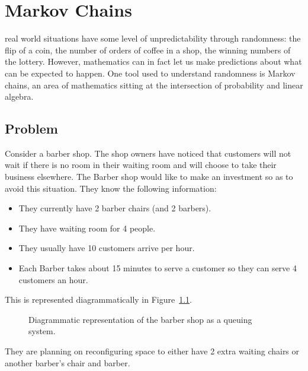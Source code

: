 \chapter[Markov Chains]{Markov Chains}\label{chp:markov_chains}

 real world situations have some level of
unpredictability through randomness: the flip of a coin, the number of orders of
coffee in a shop, the winning numbers of the lottery. However, mathematics can
in fact let us make predictions about what can be expected to happen. One tool used to
understand randomness is Markov chains, an area of mathematics sitting at the
intersection of probability and linear algebra.

\section{Problem}\label{sec:markov_chains_problem}

Consider a barber shop. The shop owners have noticed that customers will not
wait if there is no room in their waiting room and will choose to take their
business elsewhere. The Barber shop would like to make an investment so as to
avoid this situation. They know the following information:

\begin{itemize}
    \item They currently have 2 barber chairs (and 2 barbers).
    \item They have waiting room for 4 people.
    \item They usually have 10 customers arrive per hour.
    \item Each Barber takes about 15 minutes to serve a customer so they can
        serve 4 customers an hour.
\end{itemize}

This is represented diagrammatically in Figure~\ref{fig:barber-shop}.

\begin{figure}[!hbtp]
    \begin{center}
    
    \end{center}
    \caption{Diagrammatic representation of the barber shop as a queuing system.}
    \label{fig:barber-shop}
\end{figure}


They are planning on
reconfiguring space to either have 2 extra waiting chairs or
another barber's chair and barber.

